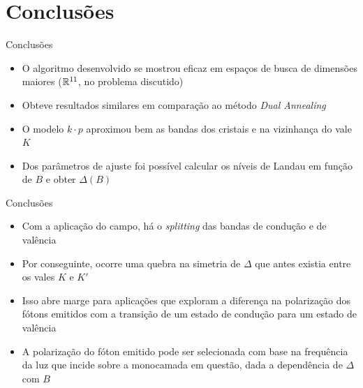 \section{Conclusões}

\begin{frame}{Conclusões}
  \begin{itemize}
    \item O algoritmo desenvolvido se mostrou eficaz em espaços de busca de
          dimensões maiores ($\mathbb{R}^{11}$, no problema discutido)
    \item Obteve resultados similares em comparação ao método \textit{Dual Annealing}
    \item O modelo $k \cdot p$ aproximou bem as bandas dos cristais  e
           na vizinhança do vale $K$
    \item Dos parâmetros de ajuste foi possível calcular os níveis de Landau em
          função de $B$ e obter $\Delta (B)$
  \end{itemize}
\end{frame}

\begin{frame}{Conclusões}
  \begin{itemize}
    \item Com a aplicação do campo, há o \textit{splitting} das bandas de
          condução e de valência
    \item Por conseguinte, ocorre uma quebra na simetria de $\Delta$ que antes
          existia entre os vales $K$ e $K'$
    \item Isso abre marge para aplicações que exploram a diferença na
          polarização dos fótons emitidos com a transição de um
          estado de condução para um estado de valência
    \item A polarização do fóton emitido pode ser selecionada com base na
          frequência da luz que incide sobre a monocamada em questão, dada a
          dependência de $\Delta$ com $B$
  \end{itemize}
\end{frame}


